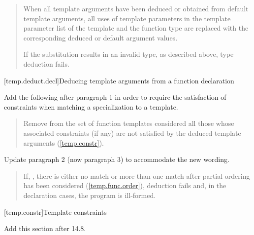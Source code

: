 \begin{quote}
\setcounter{Paras}{4}
\pnum
When all template arguments have been deduced or obtained from default 
template arguments, all uses of template parameters in the template 
parameter list of the template and the function type are replaced with
the corresponding deduced or default argument values. 

If the substitution results in an invalid type, as described above, type 
deduction fails.

\end{quote}

\setcounter{subsection}{5}
[temp.deduct.decl]{Deducing template arguments from a function declaration}

Add the following after paragraph 1 in order to require the
satisfaction of constraints when matching a specialization to a
template.

\begin{quote}
\begin{addedblock}
\setcounter{Paras}{2}
\pnum
Remove from the set of function templates considered all those
whose associated constraints (if any) are not satisfied by the deduced
template arguments (\ref{temp.constr}).
\end{addedblock}
\end{quote}

Update paragraph 2 (now paragraph 3) to accommodate the new wording.

\begin{quote}
\pnum
If, 
,
there is either no match or more than one match after partial ordering 
has been considered (\ref{temp.func.order}), deduction fails 
and, in the declaration cases, the program is ill-formed.
\end{quote}

[temp.constr]{Template constraints}

Add this section after 14.8.

